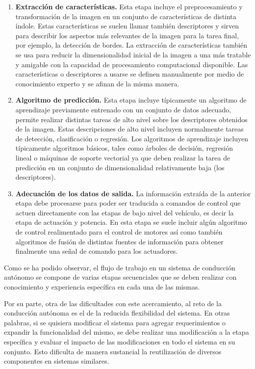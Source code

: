 \begin{enumerate}
    \item \textbf{Extracción de características.} Esta etapa incluye el preprocesamiento y transformación de la imagen 
    en un conjunto de características de distinta índole. Estas características se suelen llamar también descriptores 
    y sirven para describir los aspectos más relevantes de la imagen para la tarea final, por ejemplo, la detección de bordes. 
    La extracción de características también se usa para reducir la dimensionalidad inicial de la imagen a una más tratable y 
    amigable con la capacidad de procesamiento computacional disponible. Las características o descriptores a usarse 
    se definen manualmente por medio de conocimiento experto y se afinan de la misma manera.

    \item \textbf{Algoritmo de predicción.} Esta etapa incluye típicamente un algoritmo de aprendizaje previamente 
    entrenado con un conjunto de datos adecuado, permite realizar distintas tareas de alto nivel sobre los descriptores 
    obtenidos de la imagen. Estas descripciones de alto nivel incluyen normalmente tareas de detección, 
    clasificación o regresión. Los algoritmos de aprendizaje incluyen típicamente algoritmos básicos, tales como árboles de decisión,
    regresión lineal o máquinas de soporte vectorial ya que deben realizar la tarea de predicción en un 
    conjunto de dimensionalidad relativamente baja (los descriptores).

    \item \textbf{Adecuación de los datos de salida.} La información extraída de la anterior etapa debe 
    procesarse para poder ser traducida a comandos de control que actuen directamente con las etapas 
    de bajo nivel del vehículo, es decir la etapa de actuación y potencia. En esta etapa se suele incluir algún algoritmo 
    de control realimentado para el control de motores así como también algoritmos de fusión de distintas fuentes de información
    para obtener finalmente una señal de comando para los actuadores.
\end{enumerate}

Como se ha podido observar, el flujo de trabajo en un sistema de conducción autónomo se compone de varias etapas 
secuenciales que se deben realizar con conocimiento y experiencia específica en cada una de las mismas. 

Por su parte, otra de las dificultades con este acercamiento, al reto de la conducción autónoma es el de la reducida
flexibilidad del sistema. En otras palabras, si se quisiera modificar el sistema para agregar requerimientos o 
expandir la funcionalidad del mismo, se debe realizar una modificación a la etapa específica y evaluar el impacto de 
las modificaciones en todo el sistema en su conjunto. Esto dificulta de manera sustancial la reutilización de diversos
componentes en sistemas similares.


